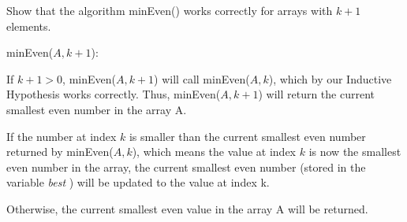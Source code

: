 \documentclass{article}
\begin{document}
      Show that the algorithm minEven() works correctly for arrays with $k+1$ elements. 

      \vspace{3mm}
      minEven($A, k+1$):

      \vspace{1.5mm}
      If $k+1 > 0$, minEven($A, k+1$) will call minEven($A, k$), which by our Inductive Hypothesis
      works correctly. Thus, minEven($A, k+1$) will return the current smallest even number 
      in the array A. 

      \vspace{3mm}
      If the number at index $k$ is smaller than the current smallest even number returned by minEven($A, k$),
      which means the value at index $k$ is now the smallest even number in the array, the current smallest
      even number (stored in the variable\textit{ best }) will be updated to the value at index k.

      \vspace{1.5mm}
      Otherwise, the current smallest even value in the array A will be returned. 
\end{document}
